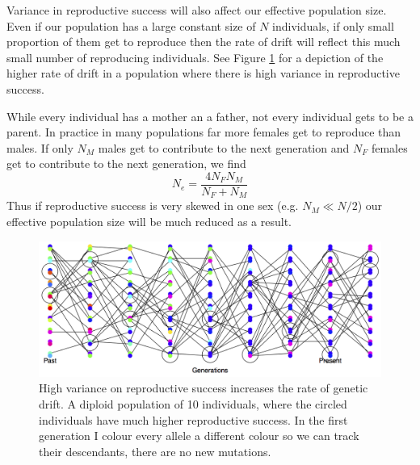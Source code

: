 Variance in reproductive success will also affect our effective
population size. Even if our population has a large constant size of $N$
individuals, if only small proportion of them get to reproduce then
the rate of drift will reflect this much small number of reproducing
individuals. See Figure \ref{fig:LossHet_varying_RS} for a depiction of the higher rate of drift
in a population where there is high variance in reproductive success.


While every individual has a mother an a father, not every individual
gets to be a parent. In practice in many populations far more females
get to reproduce than males. If only $N_M$ males get to contribute to the next
generation and $N_F$ females get to contribute to the next
generation, we find
\begin{equation}
N_e = \frac{4N_FN_M}{N_F+N_M}
\end{equation}
Thus if reproductive success is very skewed in one sex (e.g. $N_M \ll
N/2$) our effective population size will be much reduced as a result.\\

\begin{figure}
\begin{center}
\includegraphics[width= \textwidth]{figures/Loss_of_he_col_alleles_varying_RS.png}
\end{center}
\caption{High variance on reproductive success increases the rate of genetic drift. A diploid population of 10 individuals, where the circled
  individuals have much higher reproductive success. In the first generation I colour every allele a different
colour so we can track their descendants, there are no new
  mutations.} \label{fig:LossHet_varying_RS}
\end{figure} 


